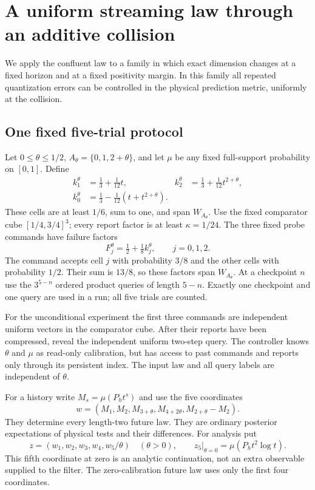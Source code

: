 \section{A uniform streaming law through an additive collision}\label{sec:uniform}
We apply the confluent law to a family in which exact dimension changes
at a fixed horizon and at a fixed positivity margin. In this family all
repeated quantization errors can be controlled in the physical prediction
metric, uniformly at the collision.

\subsection{One fixed five-trial protocol}
Let $0\le\theta\le1/2$, $A_\theta=\{0,1,2+\theta\}$, and let $\mu$
be any fixed full-support probability on $[0,1]$. Define
\begin{equation}\label{eq:near-collision-cells}
 \begin{aligned}
 k_1^\theta&=\tfrac13+\tfrac1{12}t,&
 k_2^\theta&=\tfrac13+\tfrac1{12}t^{2+\theta},\\
 k_0^\theta&=\tfrac13-\tfrac1{12}(t+t^{2+\theta}).
 \end{aligned}
\end{equation}
These cells are at least $1/6$, sum to one, and span $W_{A_\theta}$.
Use the fixed comparator cube $[1/4,3/4]^3$; every report factor is at
least $\kappa=1/24$. The three fixed probe commands have failure factors
\begin{equation}\label{eq:common-near-probes}
 F_j^\theta=\tfrac12+\tfrac18 k_j^\theta,\qquad j=0,1,2.
\end{equation}
The command accepts cell $j$ with probability $3/8$ and the other cells
with probability $1/2$. Their sum is $13/8$, so these factors span
$W_{A_\theta}$. At a checkpoint $n$ use the $3^{5-n}$ ordered product
queries of length $5-n$. Exactly one checkpoint and one query are used
in a run; all five trials are counted.

For the unconditional experiment the first three commands are independent
uniform vectors in the comparator cube. After their reports have been
compressed, reveal the independent uniform two-step query. The controller
knows $\theta$ and $\mu$ as read-only calibration, but has access to past
commands and reports only through its persistent index. The input law and
all query labels are independent of $\theta$.

For a history write $M_s=\mu(P_h t^s)$ and use the five coordinates
\begin{equation}\label{eq:five-physical-coordinates}
 w=(M_1,M_2,M_{3+\theta},M_{4+2\theta},M_{2+\theta}-M_2).
\end{equation}
They determine every length-two future law. They are ordinary posterior
expectations of physical tests and their differences. For analysis put
\begin{equation}\label{eq:five-desingularized}
 z=(w_1,w_2,w_3,w_4,w_5/\theta)\quad(\theta>0),
 \qquad z_5\big|_{\theta=0}=\mu(P_h t^2\log t).
\end{equation}
This fifth coordinate at zero is an analytic continuation, not an extra
observable supplied to the filter. The zero-calibration future law uses
only the first four coordinates.

